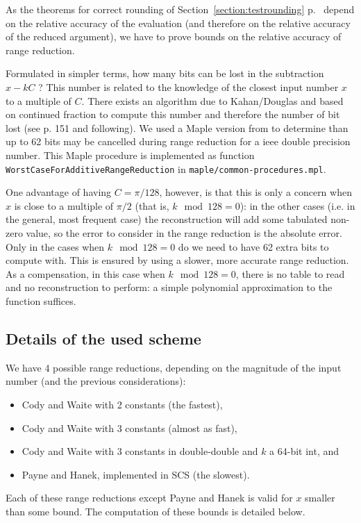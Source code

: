 As the theorems for correct rounding of
Section~\ref{section:testrounding} p.~\pageref{section:testrounding}
depend on the relative accuracy of the evaluation (and therefore on
the relative accuracy of the reduced argument), we have to prove
bounds on the relative accuracy of range reduction.

Formulated in simpler terms, how many bits can be lost in the
subtraction $x-kC$ ? This number is related to the knowledge of the
closest input number $x$ to a multiple of $C$. There exists an
algorithm due to Kahan/Douglas and based on continued fraction to
compute this number and therefore the number of bit lost (see
\cite{Muller97} p. 151 and following).  We used a Maple version from
\cite{Muller97} to determine than up to 62 bits may be cancelled
during range reduction for a ieee double precision number. This Maple
procedure is implemented as function
\texttt{WorstCaseForAdditiveRangeReduction} in
\texttt{maple/common-procedures.mpl}.

One advantage of having $C=\pi/128$, however, is that this is only a
concern when $x$ is close to a multiple of $\pi/2$ (that is, $k \mod
128=0$): in the other cases (i.e. in the general, most frequent case)
the reconstruction will add some tabulated non-zero value, so the
error to consider in the range reduction is the absolute error.  Only
in the cases when $k \mod 128=0$ do we need to have 62 extra bits to
compute with. This is ensured by using a slower, more accurate range
reduction. As a compensation, in this case when $k \mod 128=0$, there
is no table to read and no reconstruction to perform: a simple
polynomial approximation to the function suffices.



\subsection{Details of the used scheme}

We have 4 possible range reductions, depending on the magnitude of the
input number (and the previous considerations):

\begin{itemize}
\item Cody and Waite with 2 constants (the fastest),
\item Cody and Waite with 3 constants (almost as fast),
\item Cody and Waite with 3 constants in double-double and $k$ a
  64-bit int, and
\item Payne and Hanek, implemented in SCS (the slowest).
\end{itemize}
Each of these range reductions except Payne and Hanek is valid for $x$
smaller than some bound. The computation of these bounds is detailed
below.

